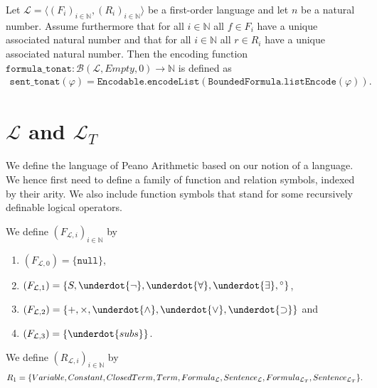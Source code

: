 \begin{definition}\label{def:S-To-N}
  \leanok
    Let $\mathcal{L} = \langle (F_i)_{i \in \mathbb{N}}, (R_i)_{i \in \mathbb{N}} \rangle$ be a first-order language and let $n$ be a natural number. Assume furthermore that for all $i \in \mathbb{N}$ all $f \in F_i$ have a unique associated natural number and that for all $i \in \mathbb{N}$ all $r \in R_i$ have a unique associated natural number. Then the encoding function $\texttt{formula\_tonat} : \mathcal{B}(\mathcal{L},Empty,0) \to \mathbb{N}$ is defined as 
    \begin{align*}
        \texttt{sent\_tonat}(\varphi) = \texttt{Encodable.encodeList}(\texttt{BoundedFormula.listEncode}(\varphi)).
    \end{align*}
\end{definition}

\section{$\mathcal{L}$ and $\mathcal{L}_T$}\label{subsec:lpa-lt}
We define the language of Peano Arithmetic based on our notion of a language. We hence first need to define a family of function and relation symbols, indexed by their arity. We also include function symbols that stand for some recursively definable logical operators.

\begin{definition}\label{def:L-Func}
  \leanok
  We define $(F_{\mathcal{L},i})_{i \in \mathbb{N}}$ by
  \begin{enumerate}
  \item $(F_{\mathcal{L},0}) = \{\texttt{null}\}$,
  \item $(F_{\mathcal{L},1}) = \{S, \underdot{\neg} , \underdot{\forall}, \underdot{\exists}, {^\circ}\}$,
  \item $(F_{\mathcal{L},2}) = \{+,\times, \underdot{\wedge}, \underdot{\vee}, \underdot{\supset}\}$ and
  \item $(F_{\mathcal{L},3}) = \{\underdot{subs}\}$.
  \end{enumerate}
\end{definition}

\begin{definition}\label{def:L-Rel}
  \leanok
  We define $(R_{\mathcal{L},i})_{i \in \mathbb{N}}$ by \[R_1 = \{Variable, Constant, ClosedTerm, Term, Formula_{\mathcal{L}}, Sentence_{\mathcal{L}}, \\ Formula_{\mathcal{L}_T}, Sentence_{\mathcal{L}_T}\}.\]
\end{definition}

